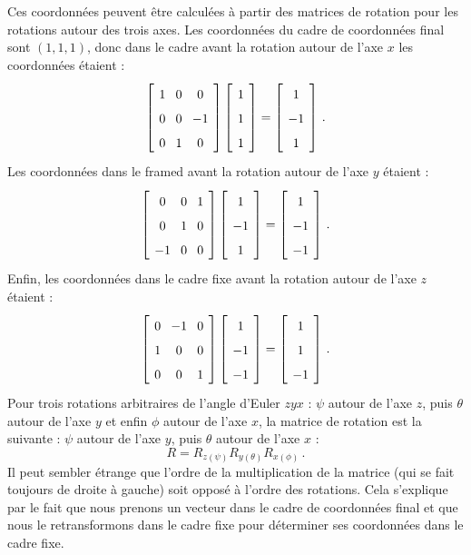 Ces coordonnées peuvent être calculées à partir des matrices de rotation pour les rotations autour des trois axes. Les coordonnées du cadre de coordonnées final sont $(1,1,1)$, donc dans le cadre avant la rotation autour de l'axe $x$ les coordonnées étaient :
\[
\spacearray
\left[\begin{array}{ccc}1&0&0\\0&0&-1\\0&1&0\\\end{array}\right]
\left[\begin{array}{c}1\\1\\1\end{array}\right]=
\left[\begin{array}{c}1\\-1\\1\end{array}\right]\,.
\]
Les coordonnées dans le framed avant la rotation autour de l'axe $y$ étaient :
\[
\spacearray
\left[\begin{array}{ccc}0&0&1\\0&1&0\\-1&0&0\\\end{array}\right]
\left[\begin{array}{c}1\\-1\\1\end{array}\right]=
\left[\begin{array}{c}1\\-1\\-1\end{array}\right]\,.
\]
Enfin, les coordonnées dans le cadre fixe avant la rotation autour de l'axe $z$ étaient :
\[
\spacearray
\left[\begin{array}{ccc}0&-1&0\\1&0&0\\0&0&1\\\end{array}\right]
\left[\begin{array}{c}1\\-1\\-1\end{array}\right]=
\left[\begin{array}{c}1\\1\\-1\end{array}\right]\,.
\]
Pour trois rotations arbitraires de l'angle d'Euler $zyx$ : $\psi$ autour de l'axe $z$, puis $\theta$ autour de l'axe $y$ et enfin $\phi$ autour de l'axe $x$, la matrice de rotation est la suivante : $\psi$ autour de l'axe $y$, puis $\theta$ autour de l'axe $x$ :
\[
R=R_{z(\psi)}R_{y(\theta)}R_{x(\phi)}\,.
\]
Il peut sembler étrange que l'ordre de la multiplication de la matrice (qui se fait toujours de droite à gauche) soit opposé à l'ordre des rotations. Cela s'explique par le fait que nous prenons un vecteur dans le cadre de coordonnées final et que nous le retransformons dans le cadre fixe pour déterminer ses coordonnées dans le cadre fixe.

